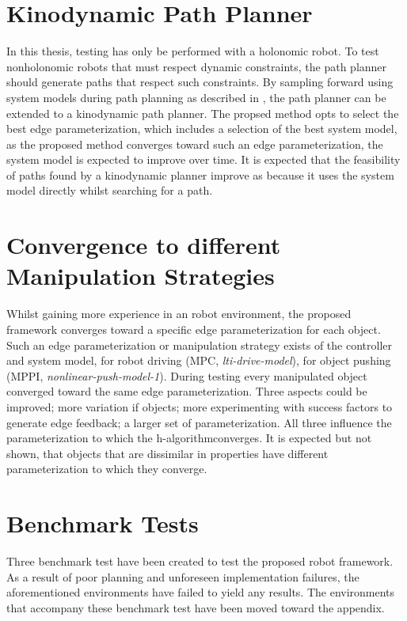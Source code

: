 \section*{Kinodynamic Path Planner}
In this thesis, testing has only be performed with a holonomic robot. To test nonholonomic robots that must respect dynamic constraints, the path planner should generate paths that respect such constraints. By sampling forward using system models during path planning as described in , the path planner can be extended to a kinodynamic path planner. The propsed method opts to select the best edge parameterization, which includes a selection of the best system model, as the proposed method converges toward such an edge parameterization, the system model is expected to improve over time. It is expected that the feasibility of paths found by a kinodynamic planner improve as because it uses the system model directly whilst searching for a path.\bs

\section*{Convergence to different Manipulation Strategies}
Whilst gaining more experience in an robot environment, the proposed framework converges toward a specific edge parameterization for each object. Such an edge parameterization or manipulation strategy exists of the controller and system model, for robot driving (\ac{MPC}, \textit{lti-drive-model}), for object pushing (\ac{MPPI}, \textit{nonlinear-push-model-1}). During testing every manipulated object converged toward the same edge parameterization. Three aspects could be improved; more variation if objects; more experimenting with success factors to generate edge feedback; a larger set of parameterization. All three influence the parameterization to which the \ac{h-algorithm}converges. It is expected but not shown, that objects that are dissimilar in properties have different parameterization to which they converge. 

\section*{Benchmark Tests}
Three benchmark test have been created to test the proposed robot framework. As a result of poor planning and unforeseen implementation failures, the aforementioned environments have failed to yield any results. The environments that accompany these benchmark test have been moved toward the appendix.\bs
